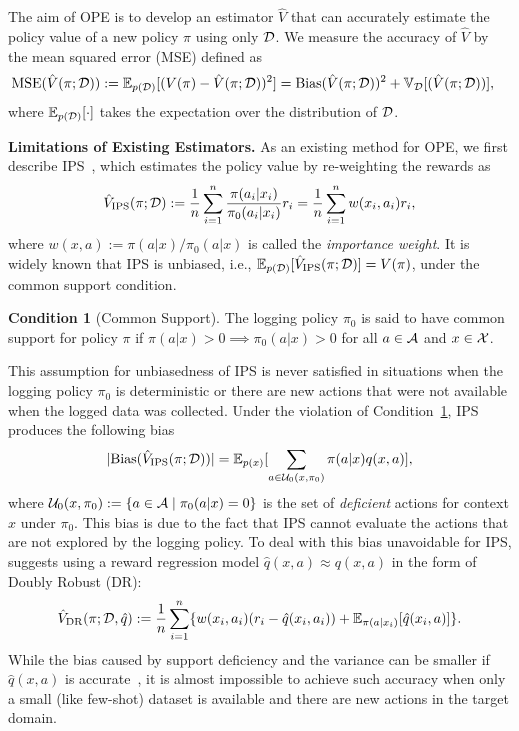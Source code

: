 \documentclass{article} %
\theoremstyle{definition}
\newtheorem{assum}{Condition}[section]
\begin{document}
The aim of OPE is to develop an estimator $\hat{V}$ that can accurately estimate the policy value of a new policy $\pi$ using only $\mathcal{D}$. We measure the accuracy of $\hat{V}$ by the mean squared error (MSE) defined as
\begin{align*}
   \mathrm{MSE}(\hat{V}(\pi;\mathcal{D}))&:=\mathbb{E}_{p(\mathcal{D})}\lbrack (V(\pi) - \hat{V}(\pi;\mathcal{D}))^2\rbrack = \mathrm{Bias}(\hat{V}(\pi;\mathcal{D}))^2+\mathbb{V}_{\mathcal{D}}\lbrack(\hat{V}(\pi;\mathcal{D}))\rbrack, 
\end{align*}
where $\mathbb{E}_{p(\mathcal{D})}[\cdot]$ takes the expectation over the distribution of $\mathcal{D}$.

\textbf{Limitations of Existing Estimators.}
As an existing method for OPE, we first describe IPS~\citep{horvitz1952generalization}, which estimates the policy value by re-weighting the rewards as 
\begin{align}
     \hat{V}_{\rm{IPS}}(\pi;\mathcal{D}):=\frac{1}{n}\sum_{i=1}^{n}\frac{\pi(a_{i}|x_{i})}{\pi_0(a_{i}|x_{i})}r_{i}=\frac{1}{n}\sum_{i=1}^{n}w(x_{i},a_{i})r_{i}, \label{eq:ips}
\end{align}
where $w(x,a):=\pi(a|x) / \pi_0(a|x)$ is called the \textit{importance weight}. 
It is widely known that IPS is unbiased, i.e., $\mathbb{E}_{p(\mathcal{D})}[\hat{V}_{\rm{IPS}}(\pi;\mathcal{D})] = V(\pi)$, under the common support condition.

\begin{assum}[Common Support]
\label{assum2.1}
The logging policy $\pi_0$ is said to have common support for policy $\pi$ if $\pi(a|x)>0 \implies \pi_0(a|x)>0$ for all $a\in\mathcal{A}$ and $x\in \mathcal{X}$.
\end{assum}

This assumption for unbiasedness of IPS is never satisfied in situations when the logging policy $\pi_0$ is deterministic or there are new actions that were not available when the logged data was collected. Under the violation of Condition~\ref{assum2.1}, IPS produces the following bias~\citep{sachdeva2020off}
\begin{align}
    |\mathrm{Bias}(\hat{V}_{\rm{IPS}}(\pi;\mathcal{D}))|=\mathbb{E}_{p(x)}\lbrack \sum_{a\in \mathcal{U}_0(x,\pi_0)}\pi(a|x)q(x,a)\rbrack, \label{eq:bias-of-ips}    
\end{align}
where $\mathcal{U}_0(x,\pi_0):=\{a\in \mathcal{A} \mid \pi_0(a|x)=0\}$ is the set of \textit{deficient} actions for context $x$ under $\pi_0$.
This bias is due to the fact that IPS cannot evaluate the actions that are not explored by the logging policy. To deal with this bias unavoidable for IPS, \cite{sachdeva2020off} suggests using a reward regression model $\hat{q}(x,a) \approx q(x,a)$ in the form of Doubly Robust (DR):
\begin{align}
    \hat{V}_{\rm{DR}}(\pi;\mathcal{D}, \hat{q}):=\frac{1}{n}\sum_{i=1}^{n}\{w(x_{i},a_{i})(r_{i}-\hat{q}(x_{i},a_{i}))+ \mathbb{E}_{\pi(a|x_i)}\lbrack \hat{q}(x_i,a)\rbrack \}. \label{eq:dr}
\end{align}
While the bias caused by support deficiency and the variance can be smaller if $\hat{q}(x, a)$ is accurate~\citep{dudik2014doubly,sachdeva2020off}, it is almost impossible to achieve such accuracy when only a small (like few-shot) dataset is available and there are new actions in the target domain.
\end{document}
